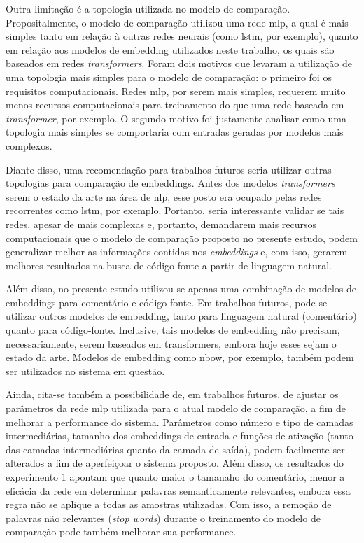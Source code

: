 Outra limitação é a topologia utilizada no modelo de comparação. Propositalmente, o modelo de comparação utilizou uma rede \gls{mlp}, a qual é mais simples tanto em relação à outras redes neurais (como \gls{lstm}, por exemplo), quanto em relação aos modelos de embedding utilizados neste trabalho, os quais são baseados em redes \textit{transformers}. Foram dois motivos que levaram a utilização de uma topologia mais simples para o modelo de comparação: o primeiro foi os requisitos computacionais. Redes \gls{mlp}, por serem mais simples, requerem muito menos recursos computacionais para treinamento do que uma rede baseada em \textit{transformer}, por exemplo. O segundo motivo foi justamente analisar como uma topologia mais simples se comportaria com entradas geradas por modelos mais complexos.

Diante disso, uma recomendação para trabalhos futuros seria utilizar outras topologias para comparação de embeddings. Antes dos modelos \textit{transformers} serem o estado da arte na área de \gls{nlp}, esse posto era ocupado pelas redes recorrentes como \gls{lstm}, por exemplo. Portanto, seria interessante validar se tais redes, apesar de mais complexas e, portanto, demandarem mais recursos computacionais que o modelo de comparação proposto no presente estudo, podem generalizar melhor as informações contidas nos \textit{embeddings} e, com isso, gerarem melhores resultados na busca de código-fonte a partir de linguagem natural.

Além disso, no presente estudo utilizou-se apenas uma combinação de modelos de embeddings para comentário e código-fonte. Em trabalhos futuros, pode-se utilizar outros modelos de embedding, tanto para linguagem natural (comentário) quanto para código-fonte. Inclusive, tais modelos de embedding não precisam, necessariamente, serem baseados em transformers, embora hoje esses sejam o estado da arte. Modelos de embedding como \gls{nbow}, por exemplo, também podem ser utilizados no sistema em questão.

Ainda, cita-se também a possibilidade de, em trabalhos futuros, de ajustar os parâmetros da rede \gls{mlp} utilizada para o atual modelo de comparação, a fim de melhorar a performance do sistema. Parâmetros como número e tipo de camadas intermediárias, tamanho dos embeddings de entrada e funções de ativação (tanto das camadas intermediárias quanto da camada de saída), podem facilmente ser alterados a fim de aperfeiçoar o sistema proposto. Além disso, os resultados do experimento 1 apontam que quanto maior o tamanaho do comentário, menor a eficácia da rede em determinar palavras semanticamente relevantes, embora essa regra não se aplique a todas as amostras utilizadas. Com isso, a remoção de palavras não relevantes (\textit{stop words}) durante o treinamento do modelo de comparação pode também melhorar sua performance.

